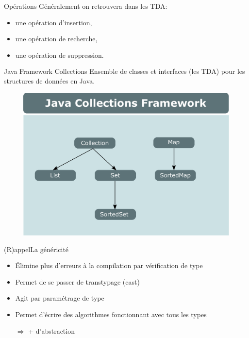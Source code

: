 \documentclass[12pt,a4paper,handout]{beamer}
\begin{document}
\begin{frame}{Opérations}
Généralement on retrouvera dans les TDA:
\begin{itemize}
\item une opération d'insertion,
\item une opération de recherche,
\item une opération de suppression.
\end{itemize}

\end{frame}

\begin{frame}{Java Framework Collections}
Ensemble de classes et interfaces (les TDA) pour les structures de données en Java.

\begin{figure}
\centering
\includegraphics[scale=0.4]{figs/framework_collections_java} 
\end{figure}



\end{frame}

\begin{frame}{(R)appel}{La généricité}

\begin{itemize}
\item Élimine plus d'erreurs à la compilation par vérification de type
\item Permet de se passer de transtypage (cast)
\item Agit par paramétrage de type
\item Permet d'écrire des algorithmes fonctionnant avec tous les types
\pause \item[$\Rightarrow$] + d'abstraction
\end{itemize}




\end{frame}
\end{document}
